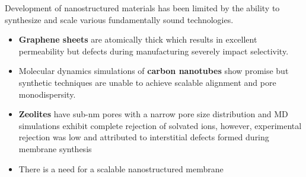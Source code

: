 \documentclass{article}
\begin{document}
  Development of nanostructured materials has been limited by the ability
  to synthesize and scale various fundamentally sound technologies.
  \begin{itemize}
    \item \textbf{Graphene sheets} are atomically thick which results in excellent
    permeability but defects during manufacturing severely impact 
    selectivity. \cite{cohen-tanugi_multilayer_2016}
    \item Molecular dynamics simulations of \textbf{carbon nanotubes} show
    promise \cite{humplik_nanostructured_2011} but synthetic techniques are 
    unable to achieve scalable alignment and pore monodispersity.\cite{hata_water-assisted_2004,maruyama_growth_2005}
    \item \textbf{Zeolites} have sub-nm pores with a narrow pore size 
    distribution and MD simulations exhibit complete rejection of solvated ions, \cite{murad_molecular_1998}
    however, experimental rejection was low and attributed to interstitial
    defects formed during membrane synthesis \cite{li_desalination_2004}
    \item There is a need for a scalable nanostructured membrane
  \end{itemize}
  
\end{document}

